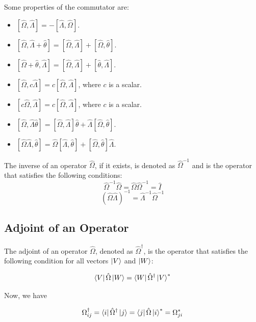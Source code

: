 \documentclass[12pt,a4paper]{report}
\begin{document}
Some properties of the commutator are:
\begin{itemize}
    \item $[\hat{\Omega}, \hat{\Lambda}] = -[\hat{\Lambda}, \hat{\Omega}]$.
    \item $[\hat{\Omega}, \hat{\Lambda} + \hat{\theta}] = [\hat{\Omega}, \hat{\Lambda}] + [\hat{\Omega}, \hat{\theta}]$.
    \item $[\hat{\Omega} + \hat{\theta}, \hat{\Lambda}] = [\hat{\Omega}, \hat{\Lambda}] + [\hat{\theta}, \hat{\Lambda}]$.
    \item $[\hat{\Omega}, c\hat{\Lambda}] = c[\hat{\Omega}, \hat{\Lambda}]$, where $c$ is a scalar.
    \item $[c\hat{\Omega}, \hat{\Lambda}] = c[\hat{\Omega}, \hat{\Lambda}]$, where $c$ is a scalar.
    \item $[\hat{\Omega}, \hat{\Lambda}\hat{\theta}] = [\hat{\Omega}, \hat{\Lambda}]\hat{\theta} + \hat{\Lambda}[\hat{\Omega}, \hat{\theta}]$.
    \item $[\hat{\Omega}\hat{\Lambda}, \hat{\theta}] = \hat{\Omega}[\hat{\Lambda}, \hat{\theta}] + [\hat{\Omega}, \hat{\theta}]\hat{\Lambda}$.
\end{itemize}

The inverse of an operator $\hat{\Omega}$, if it exists, is denoted as $\hat{\Omega}^{-1}$ and is the operator that satisfies the following conditions:
\begin{equation*}
    \hat{\Omega}^{-1} \hat{\Omega} = \hat{\Omega} \hat{\Omega}^{-1} = \hat{I}
\end{equation*}
\begin{equation*}
    (\hat{\Omega}\hat{\Lambda})^{-1} = \hat{\Lambda}^{-1} \hat{\Omega}^{-1}
\end{equation*}

\subsection{Adjoint of an Operator}

The adjoint of an operator $\hat{\Omega}$, denoted as $\hat{\Omega}^\dagger$, is the operator that satisfies the following condition for all vectors $\ket{V}$ and $\ket{W}$:

\begin{equation*}
    \bra{V}\hat{\Omega}\ket{W} = \bra{W}\hat{\Omega}^\dagger\ket{V}^*
\end{equation*}

Now, we have

\begin{equation*}
    \Omega^\dagger_{ij} = \bra{i}\hat{\Omega}^\dagger\ket{j} = \bra{j}\hat{\Omega}\ket{i}^* = \Omega_{ji}^*
\end{equation*}
\end{document}
